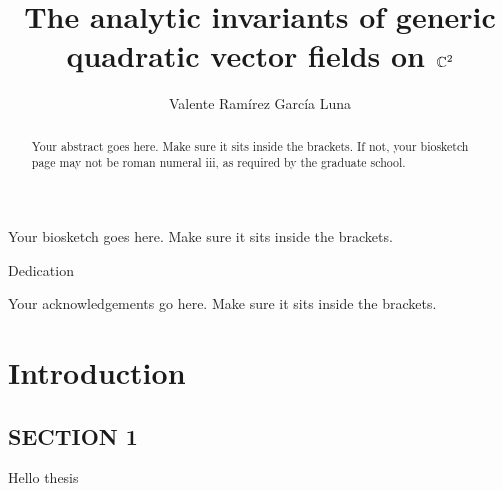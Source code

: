 \documentclass[phd,tocprelim]{cornell}
\title {The analytic invariants of generic quadratic vector fields on \texorpdfstring{$\mathbb{C}^2$}{C2}}
\author {Valente Ram\'{i}rez Garc\'{i}a Luna}
\begin{document}
\maketitle
\makecopyright

\begin{abstract}
Your abstract goes here. Make sure it sits inside the brackets. If not,
your biosketch page may not be roman numeral iii, as required by the
graduate school.
\end{abstract}

\begin{biosketch}
Your biosketch goes here. Make sure it sits inside
the brackets.
\end{biosketch}

\begin{dedication}
Dedication
\end{dedication}

\begin{acknowledgements}
Your acknowledgements go here. Make sure it sits inside the brackets.
\end{acknowledgements}

\contentspage

\normalspacing \setcounter{page}{1} 
\pagestyle{cornell} \addtolength{\parskip}{0.5\baselineskip}

\chapter{Introduction}

\section{SECTION 1}
Hello thesis


\nocite{StrongTopoInvariance,UtmostRigidity,TwinVectorFields,WoodsHole}

\end{document}
